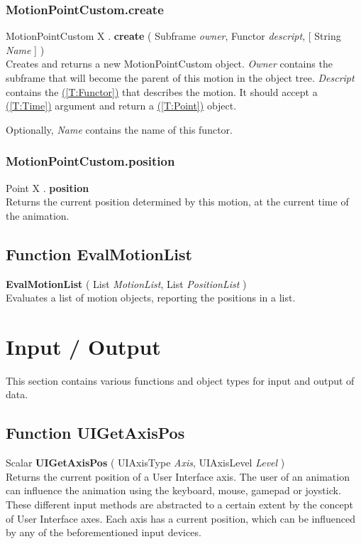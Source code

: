 \documentclass[10pt]{book}
\newcommand{\linkitem}[1]{\hyperref[#1]{\nameref{#1} (\ref{#1})}}
\newcommand{\var}[1]{\textit{#1}}
\begin{document}
\subsubsection{MotionPointCustom.create \label{F:MotionPointCustom:create}}
MotionPointCustom X . \textbf{create} ( Subframe \textit{owner}, Functor \textit{descript},  [ String \textit{Name} ] ) \\
Creates and returns a new MotionPointCustom object. \var{Owner} contains the subframe that will become the parent of this motion in the object tree. \var{Descript} contains the \linkitem{T:Functor} that describes the motion. It should accept a \linkitem{T:Time} argument and return a \linkitem{T:Point} object.

Optionally, \var{Name} contains the name of this functor.


\subsubsection{MotionPointCustom.position \label{F:MotionPointCustom:position}}
Point X . \textbf{position} \\
Returns the current position determined by this motion, at the current time of the animation.


\subsection{Function EvalMotionList \label{F:EvalMotionList}}
\textbf{EvalMotionList} ( List \textit{MotionList}, List \textit{PositionList} ) \\
Evaluates a list of motion objects, reporting the positions in a list.

\section{Input / Output \label{Input / Output}}
This section contains various functions and object types for input and output of data.

\subsection{Function UIGetAxisPos \label{F:UIGetAxisPos}}
Scalar \textbf{UIGetAxisPos} ( UIAxisType \textit{Axis}, UIAxisLevel \textit{Level} ) \\
Returns the current position of a User Interface axis. The user of an animation can influence the animation using the keyboard, mouse, gamepad or joystick. These different input methods are abstracted to a certain extent by the concept of User Interface axes. Each axis has a current position, which can be influenced by any of the beforementioned input devices.
\end{document}
